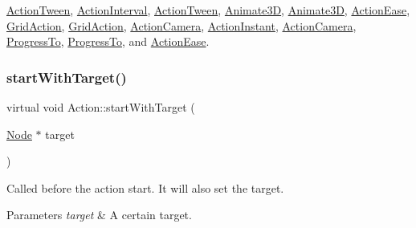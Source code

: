 \hyperlink{classActionTween_ae530a9f86b98f8d4a336c4b0774311aa}{Action\+Tween}, \hyperlink{classActionInterval_ad3d91186b2c3108488ddbbdbbd982484}{Action\+Interval}, \hyperlink{classActionTween_ae530a9f86b98f8d4a336c4b0774311aa}{Action\+Tween}, \hyperlink{classAnimate3D_a684fa4c9666a80e949c45356e1c1961f}{Animate3D}, \hyperlink{classAnimate3D_a0c04fb9d432a3fd7811235c492a4969f}{Animate3D}, \hyperlink{classActionEase_a04976f42219b97e850043ab9cd182918}{Action\+Ease}, \hyperlink{classGridAction_a04dfa701007c415bb130766c99357334}{Grid\+Action}, \hyperlink{classGridAction_a33e2c1bc95bbcf6b16428097b4fd4b61}{Grid\+Action}, \hyperlink{classActionCamera_a8f0cefd9df0f40a71d868e753a8cc3bc}{Action\+Camera}, \hyperlink{classActionInstant_a47cff49ef73e126e5e9d6c26872a9e23}{Action\+Instant}, \hyperlink{classActionCamera_ab523607be45f90017decf4c5e493c733}{Action\+Camera}, \hyperlink{classProgressTo_ac32af7881cffffec6eb7dcfcb0a18c6b}{Progress\+To}, \hyperlink{classProgressTo_a9533f1dab48b9243b170f463b8498f07}{Progress\+To}, and \hyperlink{classActionEase_a2b1a6fe2d83fe96723ca32c30301fda5}{Action\+Ease}.

\mbox{\label{classAction_aa082eec3cbe15a9510ec440edc684359}} 
\subsubsection{\texorpdfstring{start\+With\+Target()}{startWithTarget()}\hspace{0.1cm}{\footnotesize\ttfamily [2/2]}}
{\footnotesize\ttfamily virtual void Action\+::start\+With\+Target (\begin{DoxyParamCaption}\item[{\hyperlink{classNode}{Node} $\ast$}]{target }\end{DoxyParamCaption})\hspace{0.3cm}{\ttfamily [virtual]}}

Called before the action start. It will also set the target.


\begin{DoxyParams}{Parameters}
{\em target} & A certain target. \\
\hline
\end{DoxyParams}


